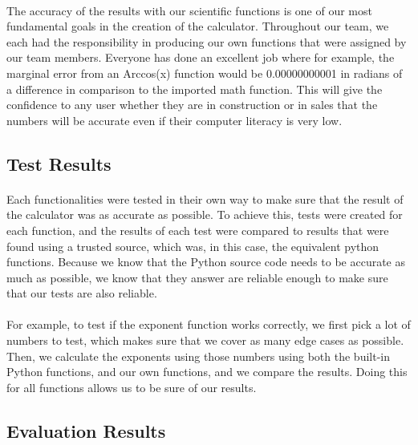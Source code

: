         \paragraph{}
        The accuracy of the results with our scientific functions is one of our most fundamental goals in the creation of the calculator. Throughout our team, we each had the responsibility in producing our own functions that were assigned by our team members. Everyone has done an excellent job where for example, the marginal error from an Arccos(x) function would be 0.00000000001 in radians of a difference in comparison to the imported math function. This will give the confidence to any user whether they are in construction or in sales that the numbers will be accurate even if their computer literacy is very low.

    \subsection{Test Results}
        \paragraph{}
        Each functionalities were tested in their own way to make sure that the result of the calculator was as accurate as possible. To achieve this, tests were created for each function, and the results of each test were compared to results that were found using a trusted source, which was, in this case, the equivalent python functions. Because we know that the Python source code needs to be accurate as much as possible, we know that they answer are reliable enough to make sure that our tests are also reliable.

        \paragraph{}
        For example, to test if the exponent function works correctly, we first pick a lot of numbers to test, which makes sure that we cover as many edge cases as possible. Then, we calculate the exponents using those numbers using both the built-in Python functions, and our own functions, and we compare the results. Doing this for all functions allows us to be sure of our results.

    \subsection{Evaluation Results}
